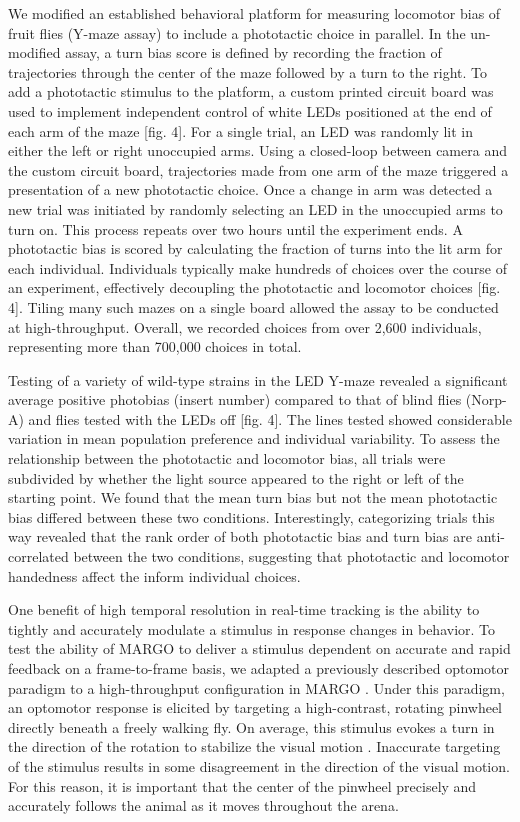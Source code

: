 \documentclass[10pt]{article}
\begin{document}
\begin{multicols}{2}
We modified an established behavioral platform for measuring locomotor bias of fruit flies (Y-maze assay) \cite{Buchanan_Neuronal_2015,Ayroles_Behavioral_2015} to include a phototactic choice in parallel. In the un-modified assay, a turn bias score is defined by recording the fraction of trajectories through the center of the maze followed by a turn to the right. To add a phototactic stimulus to the platform, a custom printed circuit board was used to implement independent control of white LEDs positioned at the end of each arm of the maze [fig. 4]. For a single trial, an LED was randomly lit in either the left or right unoccupied arms. Using a closed-loop between camera and the custom circuit board, trajectories made from one arm of the maze triggered a presentation of a new phototactic choice. Once a change in arm was detected a new trial was initiated by randomly selecting an LED in the unoccupied arms to turn on. This process repeats over two hours until the experiment ends. A phototactic bias is scored by calculating the fraction of turns into the lit arm for each individual. Individuals typically make hundreds of choices over the course of an experiment, effectively decoupling the phototactic and locomotor choices [fig. 4]. Tiling many such mazes on a single board allowed the assay to be conducted at high-throughput. Overall, we recorded choices from over 2,600 individuals, representing more than 700,000 choices in total.

Testing of a variety of wild-type strains in the LED Y-maze revealed a significant average positive photobias (insert number) compared to that of blind flies (Norp-A) and flies tested with the LEDs off [fig. 4]. The lines tested showed considerable variation in mean population preference and individual variability. To assess the relationship between the phototactic and locomotor bias, all trials were subdivided by whether the light source appeared to the right or left of the starting point. We found that the mean turn bias but not the mean phototactic bias differed between these two conditions. Interestingly, categorizing trials this way revealed that the rank order of both phototactic bias and turn bias are anti-correlated between the two conditions, suggesting that phototactic and locomotor handedness affect the inform individual choices. 

One benefit of high temporal resolution in real-time tracking is the ability to tightly and accurately modulate a stimulus in response changes in behavior. To test the ability of MARGO to deliver a stimulus dependent on accurate and rapid feedback on a frame-to-frame basis, we adapted a previously described optomotor paradigm to a high-throughput configuration in MARGO \cite{Fujiwara_A_2017}. Under this paradigm, an optomotor response is elicited by targeting a high-contrast, rotating pinwheel directly beneath a freely walking fly. On average, this stimulus evokes a turn in the direction of the rotation to stabilize the visual motion \cite{Gtz_Visual_1973}. Inaccurate targeting of the stimulus results in some disagreement in the direction of the visual motion. For this reason, it is important that the center of the pinwheel precisely and accurately follows the animal as it moves throughout the arena.


\end{multicols}
\end{document}
